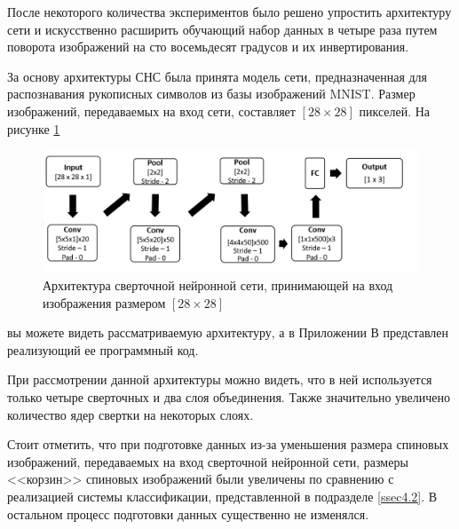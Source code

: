 \documentclass[14pt]{article}
\numberwithin{figure}{section}
\numberwithin{equation}{section}
\begin{document}
После некоторого количества экспериментов было решено упростить архитектуру сети и искусственно расширить обучающий набор данных в четыре раза путем поворота изображений на сто восемьдесят градусов и их инвертирования.

За основу архитектуры СНС была принята модель сети, предназначенная для распознавания рукописных символов из базы изображений MNIST. Размер изображений, передаваемых на вход сети, составляет $[28 \times 28]$ пикселей. На рисунке \ref{ris:11}
\begin{figure}[h]
   \begin{center}
       \includegraphics[scale=0.6] {11.JPG}
       \caption{Архитектура сверточной нейронной сети, принимающей на вход изображения размером $[28 \times 28]$}
       \label{ris:11}
   \end{center}
\end{figure}
 вы можете видеть рассматриваемую архитектуру, а в Приложении В представлен реализующий ее программный код.

При рассмотрении данной архитектуры можно видеть, что в ней используется только четыре сверточных и два слоя объединения. Также значительно увеличено количество ядер свертки на некоторых слоях.

Стоит отметить, что при подготовке данных из-за уменьшения размера спиновых изображений, передаваемых на вход сверточной нейронной сети, размеры <<корзин>> спиновых изображений были увеличены по сравнению с реализацией системы классификации, представленной в подразделе \ref{ssec4.2}. В остальном процесс подготовки данных существенно не изменялся.
\end{document}
